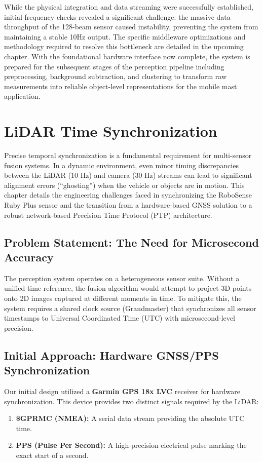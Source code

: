 \documentclass[12pt,a4paper]{report}
\begin{document}
While the physical integration and data streaming were successfully established, initial frequency checks revealed a significant challenge: the massive data throughput of the 128-beam sensor caused instability, preventing the system from maintaining a stable 10Hz output. The specific middleware optimizations and methodology required to resolve this bottleneck are detailed in the upcoming chapter. With the foundational hardware interface now complete, the system is prepared for the subsequent stages of the perception pipeline including preprocessing, background subtraction, and clustering to transform raw measurements into reliable object-level representations for the mobile mast application.


\section{LiDAR Time Synchronization}


Precise temporal synchronization is a fundamental requirement for multi-sensor fusion systems. In a dynamic environment, even minor timing discrepancies between the LiDAR (10 Hz) and camera (30 Hz) streams can lead to significant alignment errors (``ghosting'') when the vehicle or objects are in motion. This chapter details the engineering challenges faced in synchronizing the RoboSense Ruby Plus sensor and the transition from a hardware-based GNSS solution to a robust network-based Precision Time Protocol (PTP) architecture.

\subsection{Problem Statement: The Need for Microsecond Accuracy}
The perception system operates on a heterogeneous sensor suite. Without a unified time reference, the fusion algorithm would attempt to project 3D points onto 2D images captured at different moments in time. To mitigate this, the system requires a shared clock source (Grandmaster) that synchronizes all sensor timestamps to Universal Coordinated Time (UTC) with microsecond-level precision.

\subsection{Initial Approach: Hardware GNSS/PPS Synchronization}
Our initial design utilized a \textbf{Garmin GPS 18x LVC} receiver for hardware synchronization. This device provides two distinct signals required by the LiDAR:
\begin{enumerate}
    \item \textbf{\$GPRMC (NMEA):} A serial data stream providing the absolute UTC time.
    \item \textbf{PPS (Pulse Per Second):} A high-precision electrical pulse marking the exact start of a second.
\end{enumerate}
\end{document}
